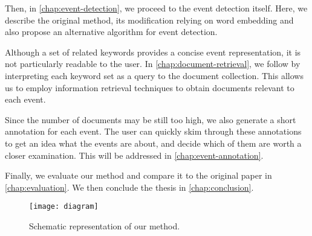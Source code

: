Then, in \autoref{chap:event-detection}, we proceed to the event detection itself. Here, we describe the original method, its modification relying on word embedding and also propose an alternative algorithm for event detection.

Although a set of related keywords provides a concise event representation, it is not particularly readable to the user. In \autoref{chap:document-retrieval}, we follow by interpreting each keyword set as a query to the document collection. This allows us to employ information retrieval techniques to obtain documents relevant to each event.

Since the number of documents may be still too high, we also generate a short annotation for each event. The user can quickly skim through these annotations to get an idea what the events are about, and decide which of them are worth a closer examination. This will be addressed in \autoref{chap:event-annotation}.

Finally, we evaluate our method and compare it to the original paper in \autoref{chap:evaluation}. We then conclude the thesis in \autoref{chap:conclusion}.

\begin{figure}[H]
  \centering
  \texttt{[image: diagram]}
  \caption{Schematic representation of our method.}
  \label{fig:diagram}
\end{figure}